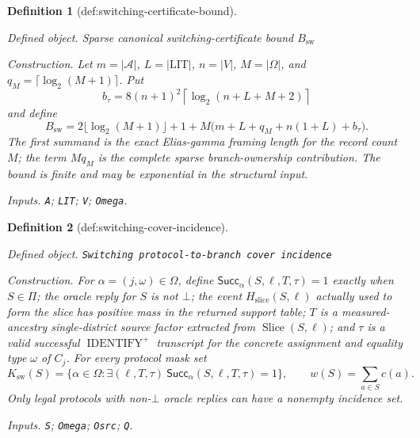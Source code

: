 \documentclass{article}
\newtheorem{definition}{Definition}
\begin{document}
\begin{definition}[def:switching-certificate-bound]\label{def:switching-certificate-bound}
\par\smallskip\noindent\emph{Defined object.} Sparse canonical switching-certificate bound \(B_{\mathrm{sw}}\)
\par\smallskip\noindent\emph{Construction.} Let \(m=|\mathcal A|\), \(L=|\mathrm{LIT}|\), \(n=|V|\), \(M=|\Omega|\), and \(q_M=\lceil\log_2(M+1)\rceil\).  Put
\[
 b_{\tau}=8(n+1)^2\left\lceil\log_2(n+L+M+2)\right\rceil
\]
and define
\[
 B_{\mathrm{sw}}
 =2\lfloor\log_2(M+1)\rfloor+1
  +M\bigl(m+L+q_M+n(1+L)+b_{\tau}\bigr).
\]
The first summand is the exact Elias-gamma framing length for the record count \(M\); the term \(Mq_M\) is the complete sparse branch-ownership contribution.  The bound is finite and may be exponential in the structural input.
\par\smallskip\noindent\emph{Inputs.} \texttt{A}; \texttt{LIT}; \texttt{V}; \texttt{Omega}.
\end{definition}

\begin{definition}[def:switching-cover-incidence]\label{def:switching-cover-incidence}
\par\smallskip\noindent\emph{Defined object.} \texttt{Switching protocol-\allowbreak{}to-\allowbreak{}branch cover incidence}
\par\smallskip\noindent\emph{Construction.} For \(\alpha=(j,\omega)\in\Omega\), define \(\mathsf{Succ}_{\alpha}(S,\ell,T,\tau)=1\) exactly when \(S\in\Pi\); the oracle reply for \(S\) is not \(\bot\); the event \(H_{\mathrm{slice}}(S,\ell)\) actually used to form the slice has positive mass in the returned support table; \(T\) is a measured-ancestry single-district source factor extracted from \(\operatorname{Slice}(S,\ell)\); and \(\tau\) is a valid successful \(\operatorname{IDENTIFY}^{+}\) transcript for the concrete assignment and equality type \(\omega\) of \(C_j\).  For every protocol mask set
\[
 K_{\mathrm{sw}}(S)
 =\{\alpha\in\Omega:\exists(\ell,T,\tau)\ 
       \mathsf{Succ}_{\alpha}(S,\ell,T,\tau)=1\},
 \qquad
 w(S)=\sum_{a\in S}c(a).
\]
Only legal protocols with non-\(\bot\) oracle replies can have a nonempty incidence set.
\par\smallskip\noindent\emph{Inputs.} \texttt{S}; \texttt{Omega}; \texttt{Osrc}; \texttt{Q}.
\end{definition}
\end{document}
